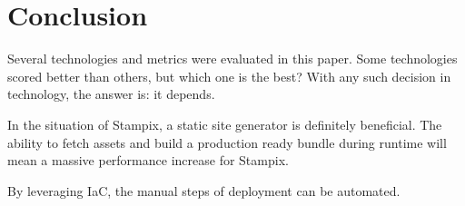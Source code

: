 \chapter{Conclusion} %

\label{Chapter6} 

Several technologies and metrics were evaluated in this paper. 
Some technologies scored better than others, but which one is the best? 
With any such decision in technology, the answer is: it depends.

In the situation of Stampix, a static site generator is definitely beneficial. 
The ability to fetch assets and build a production ready bundle during runtime will mean a massive performance increase for Stampix.

By leveraging IaC, the manual steps of deployment can be automated.
